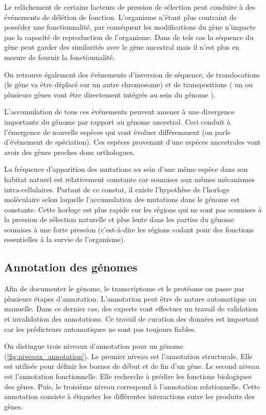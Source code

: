 \begin{refsegment}
    Le relâchement de certains facteurs de pression de sélection peut conduire à des événements de délétion de fonction. L’organisme n’étant plus contraint de posséder une fonctionnalité, par conséquent les modifications du gène n’impacte pas la capacité de reproduction de l’organisme. Dans de tels cas la séquence du gène peut garder des similarités avec le gène ancestral mais il n’est plus en mesure de fournir la fonctionnalité.
    
    On retrouve également des évènements d’inversion de séquence, de translocations (le gène va être déplacé sur un autre chromosome) et de transpositions ( un ou plusieurs gènes vont être directement intégrés au sein du génome ).
    
    L’accumulation de tous ces événements peuvent amener à une divergence importante du génome par rapport au génome ancestral. Ceci conduit à l’émergence de nouvelle espèces qui vont évoluer différemment (on parle d'évènement de spéciation). Ces espèces provenant d’une espèces ancestrales vont avoir des gènes proches donc orthologues.
    
    La fréquence d'apparition des mutations au sein d'une même espèce dans son habitat naturel est relativement constante car soumises aux mêmes mécanismes intra-cellulaires. Partant de ce constat, il existe l'hypothèse de l’horloge moléculaire selon laquelle l'accumulation des mutations dans le génome est constante. Cette horloge est plus rapide sur les régions qui ne sont pas soumises à la pression de sélection naturelle et plus lente dans les parties du génome soumises à une forte pression (c'est-à-dire les régions codant pour des fonctions essentielles à la survie de l'organisme).
    
    
    \subsection{Annotation des génomes}
    
    Afin de documenter le génome, le transcriptome et le protéome on passe par plusieurs étapes d’annotation. L’annotation peut être de nature automatique ou manuelle. Dans ce dernier cas, des experts vont effectuer un travail de validation et invalidation des annotations. Ce travail de curation des données est important car les prédicteurs automatiques ne sont pas toujours fiables.
    
    On distingue trois niveaux d’annotation pour un génome (\cref{fig:niveaux_annotation}). Le premier niveau est l’annotation structurale. Elle est utilisée pour définir les bornes de début et de fin d’un gène.  Le second niveau est l’annotation fonctionnelle. Elle recherche à prédire les fonctions biologiques des gènes. Puis, le troisième niveau correspond à l’annotation relationnelle. Cette annotation consiste à étiqueter les différentes interactions entre les produits des gènes.
    

\end{refsegment}
